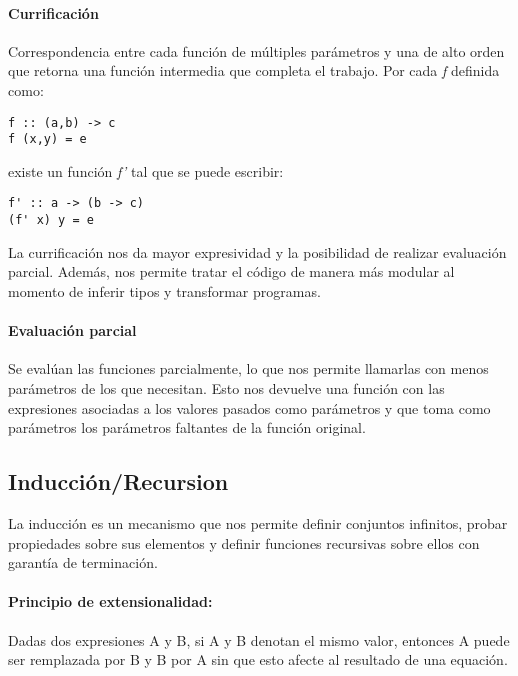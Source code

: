\documentclass[10pt,a4paper]{article}
\begin{document}
\paragraph{Currificación} Correspondencia entre cada función de múltiples parámetros y una de alto orden que retorna una función intermedia que completa el trabajo.
Por cada \textit{f} definida como:
\begin{centrado}
	\begin{verbatim}
f :: (a,b) -> c
f (x,y) = e
	\end{verbatim}
\end{centrado} 
existe un función \textit{f'} tal que se puede escribir:
\begin{centrado}
	\begin{verbatim}
f' :: a -> (b -> c)
(f' x) y = e
	\end{verbatim}
\end{centrado} 

La currificación nos da mayor expresividad y la posibilidad de realizar evaluación parcial. Además, nos permite tratar el código de manera más modular al momento de inferir tipos y transformar programas.

\paragraph{Evaluación parcial} Se evalúan las funciones parcialmente, lo que nos permite llamarlas con menos parámetros de los que necesitan. Esto nos devuelve una función con las expresiones asociadas a los valores pasados como parámetros y que toma como parámetros los parámetros faltantes de la función original.

\subsection{Inducción/Recursion}

La inducción es un mecanismo que nos permite definir conjuntos infinitos, probar propiedades sobre sus elementos y definir funciones recursivas sobre ellos con garantía de terminación.

\paragraph{Principio de extensionalidad:} Dadas dos expresiones A y B, si A y B denotan el mismo valor, entonces A puede ser remplazada por B y B por A sin que esto afecte al resultado de una equación.
\end{document}
